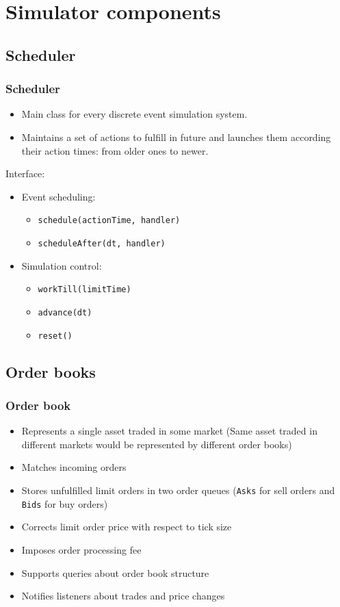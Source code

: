 \documentclass{beamer}
\begin{document}
\section{Simulator components}
\subsection{Scheduler} %
\begin{frame}
\frametitle{Scheduler}
\begin{itemize}
  \item Main class for every discrete event simulation system.
  \item Maintains a set of actions to fulfill in future and launches them according their action times: from older ones to newer.
\end{itemize}
Interface:
\begin{itemize}
  \item Event scheduling:
  \begin{itemize}
    \item \texttt{schedule(actionTime, handler)}
    \item \texttt{scheduleAfter(dt, handler)}
  \end{itemize}
  \item Simulation control:
  \begin{itemize}
    \item \texttt{workTill(limitTime)}
    \item \texttt{advance(dt)}
    \item \texttt{reset()}
  \end{itemize}
\end{itemize}
\end{frame}

\subsection{Order books} %
\begin{frame}
\frametitle{Order book}
\begin{itemize}
  \item Represents a single asset traded in some market (Same asset traded in different markets would be represented by different order books)
  \item Matches incoming orders
  \item Stores unfulfilled limit orders in two order queues (\texttt{Asks} for sell orders and \texttt{Bids} for buy orders)
  \item Corrects limit order price with respect to tick size
  \item Imposes order processing fee
  \item Supports queries about order book structure
  \item Notifies listeners about trades and price changes
\end{itemize}
\end{frame}
\end{document}
